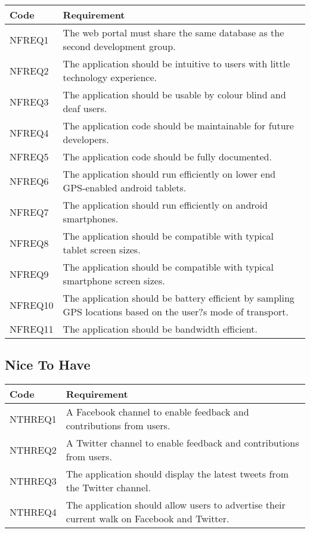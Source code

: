 \documentclass[11pt,a4paper]{article}
\begin{document}
\begin{longtable}{|p{2.5cm}p{13cm}|}
\hline
\textbf{Code} & \textbf{Requirement} \\

\hline
NFREQ1 & The web portal must share the same database as the second development group. \\ \hline
NFREQ2 & The application should be intuitive to users with little technology experience. \\ \hline
NFREQ3 & The application should be usable by colour blind and deaf users. \\ \hline
NFREQ4 & The application code should be maintainable for future developers. \\ \hline
NFREQ5 & The application code should be fully documented. \\ \hline
NFREQ6 & The application should run efficiently on lower end GPS-enabled android tablets. \\ \hline
NFREQ7 & The application should run efficiently on android smartphones. \\ \hline
NFREQ8 & The application should be compatible with typical tablet screen sizes. \\ \hline
NFREQ9 & The application should be compatible with typical smartphone screen sizes. \\ \hline
NFREQ10 & The application should be battery efficient by sampling GPS locations based on the user?s mode of transport. \\ \hline
NFREQ11 & The application should be bandwidth efficient. \\ \hline
\end{longtable}

\subsection{Nice To Have}


\begin{longtable}{|p{2.5cm}p{13cm}|}
\hline
\textbf{Code} & \textbf{Requirement} \\

\hline
NTHREQ1 & A Facebook channel to enable feedback and contributions from users. \\ \hline
NTHREQ2 & A Twitter channel to enable feedback and contributions from users. \\ \hline
NTHREQ3 & The application should display the latest tweets from the Twitter channel. \\ \hline
NTHREQ4 & The application should allow users to advertise their current walk on Facebook and Twitter. \\ \hline
\end{longtable}
\end{document}

